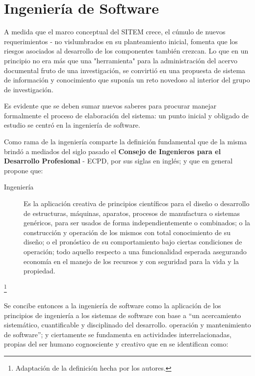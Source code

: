 \section{Ingeniería de Software}
A medida que el marco conceptual del SITEM crece, el cúmulo de nuevos requerimientos - no vislumbrados en su planteamiento inicial, fomenta que los riesgos asociados al desarrollo de los componentes también crezcan. Lo que en un principio no era más que una "herramienta" para la administración del acervo documental fruto de una investigación, se convirtió en una propuesta de sistema de información y conocimiento que suponía un reto novedoso al interior del grupo de investigación. 

Es evidente que se deben sumar nuevos saberes para procurar manejar formalmente el proceso de elaboración del sistema: un punto inicial y obligado de estudio se centró en la ingeniería de software. 

Como rama de la ingeniería comparte la definición fundamental que de la misma brindó a mediados del siglo pasado el \textbf{Consejo de Ingenieros para el Desarrollo Profesional} - ECPD, por sus siglas en inglés; y que en general propone que: \begin{description}
\item[Ingeniería]
Es la aplicación creativa de principios científicos para el diseño o desarrollo de estructuras, máquinas, aparatos, procesos de manufactura o sistemas genéricos, para ser usados de forma independientemente o combinados; o la construcción y operación de los mismos con total conocimiento de su diseño; o el pronóstico de su comportamiento bajo ciertas condiciones de operación; todo aquello respecto a una funcionalidad esperada asegurando economía en el manejo de los recursos y con seguridad para la vida y la propiedad. \end{description}\footnote{Adaptación de la definición hecha por los autores.}

Se concibe entonces a la ingeniería de software como la aplicación de los principios de ingeniería a los sistemas de software con base a “un acercamiento sistemático, cuantificable y disciplinado del desarrollo. operación y mantenimiento de software”\cite{softwareengineering}; y ciertamente se fundamenta en actividades interrelacionadas, propias del ser humano cognosciente y creativo que en \cite{objectoriented} se identifican como: 

